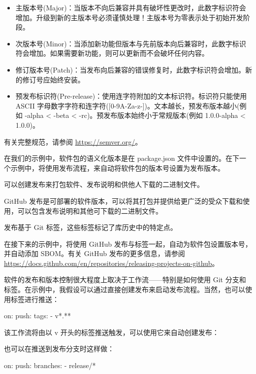\begin{itemize}
\item 
主版本号(Major)：当版本不向后兼容并具有破坏性更改时，此数字标识符会增加。升级到新的主版本号必须谨慎处理！主版本号为零表示处于初始开发阶段。

\item 
次版本号(Minor)：当添加新功能但版本与先前版本向后兼容时，此数字标识符会增加。如果需要新功能，则可以更新而不会破坏任何内容。

\item 
修订版本号(Patch)：当发布向后兼容的错误修复时，此数字标识符会增加。新的修订号应始终安装。

\item 
预发布标识符(Pre-release)：使用连字符附加的文本标识符。标识符只能使用 ASCII 字母数字字符和连字符([0-9A-Za-z-])。文本越长，预发布版本越小(例如 -alpha < -beta < -rc)。预发布版本始终小于常规版本(例如 1.0.0-alpha < 1.0.0)。
\end{itemize}

有关完整规范，请参阅 \url{https://semver.org/}。

在我们的示例中，软件包的语义化版本是在 package.json 文件中设置的。在下一个示例中，将使用发布流程，来自动将软件包的版本号设置为发布版本。


可以创建发布来打包软件、发布说明和供他人下载的二进制文件。

GitHub 发布是可部署的软件版本，可以将其打包并提供给更广泛的受众下载和使用，可以包含发布说明和其他可下载的二进制文件。

发布基于 Git 标签，这些标签标记了库历史中的特定点。

在接下来的示例中，将使用 GitHub 发布与标签一起，自动为软件包设置版本号，并自动添加 SBOM。有关 GitHub 发布的更多信息，请参阅 \url{https://docs.github.com/en/repositories/releasing-projects-on-github}。


软件的发布和版本控制很大程度上取决于工作流——特别是如何使用 Git 分支和标签。在示例中，我假设可以通过直接创建发布来启动发布流程。当然，也可以使用标签进行推送：

\begin{shell}
on:
  push:
    tags:
      - v*.**
\end{shell}

该工作流将由以 v 开头的标签推送触发，可以使用它来自动创建发布：


也可以在推送到发布分支时这样做：

\begin{shell}
on:
  push:
    branches:
      - release/*
\end{shell}






